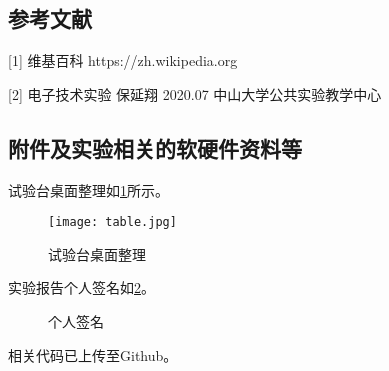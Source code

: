 \documentclass[dvipsnames, svgnames,a4paper,11pt]{article}
\begin{document}
	\subsection{参考文献}
	[1] 维基百科 https://zh.wikipedia.org
	
	[2] 电子技术实验 保延翔 2020.07 中山大学公共实验教学中心
	
	
	\subsection{附件及实验相关的软硬件资料等}
	试验台桌面整理如\cref{fig:table}所示。

	\begin{figure}[htbp]
		\centering
		\texttt{[image: table.jpg]}
		\caption{试验台桌面整理}
		\label{fig:table}
	\end{figure}
	
	实验报告个人签名如\cref{fig:name}。
	
	\begin{figure}[htbp]
		\centering
		\caption{个人签名}
		\label{fig:name}			
	\end{figure}
	
	
	相关代码已上传至Github。
	
	
	
\end{document}
